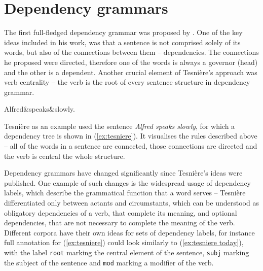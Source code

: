 \section{Dependency grammars}
The first full-fledged dependency grammar was proposed by \cite{tesniere}. One of the key ideas included in his work, was that a sentence is not comprised solely of its words, but also of the connections between them -- dependencies. The connections he proposed were directed, therefore one of the words is always a governor (head) and the other is a dependent. Another crucial element of Tesnière's approach was verb centrality -- the verb is the root of every sentence structure in dependency grammar. 

\begin{exe}
    \ex
    \label{ex:tesniere}
    \begin{dependency}[theme = simple]
    \begin{deptext}
        Alfred\&speaks\&slowly.\\
    \end{deptext}
    \end{dependency}
\end{exe}

Tesnière as an example used the sentence \textsl{Alfred speaks slowly}, for which a dependency tree is shown in (\ref{ex:tesniere}). It visualises the rules described above -- all of the words in a sentence are connected, those connections are directed and the verb is central the whole structure. 

Dependency grammars have changed significantly since Tesnière's ideas were published. One example of such changes is the widespread usage of dependency labels, which describe the grammatical function that a word serves -- Tesnière differentiated only between actants and circumstants, which can be understood as obligatory dependencies of a verb, that complete its meaning, and optional dependencies, that are not necessary to complete the meaning of the verb. Different corpora have their own ideas for sets of dependency labels, for instance full annotation for (\ref{ex:tesniere}) could look similarly to (\ref{ex:tesniere today}), with the label \texttt{root} marking the central element of the sentence, \texttt{subj} marking the subject of the sentence and \texttt{mod} marking a modifier of the verb.

